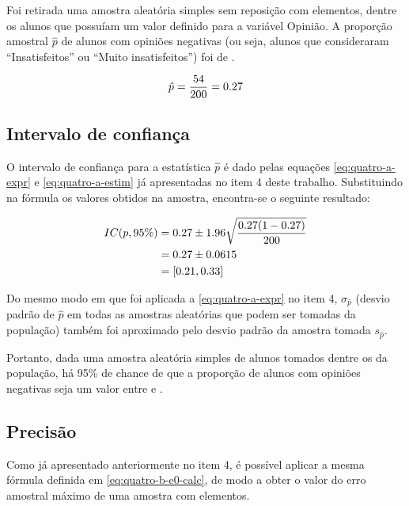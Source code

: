 

	Foi retirada uma amostra aleatória simples sem reposição com \CINCOn
	elementos, dentre os \CINCON alunos que possuíam um valor definido para
	a variável Opinião.  A proporção amostral $\hat{p}$ de alunos com
	opiniões negativas (ou seja, alunos que consideraram ``Insatisfeitos''
	ou ``Muito insatisfeitos'') foi de \CINCOpAmostral.

	\begin{align*} 
		\hat{p}  &= {\frac{54}{200}} = 0.27 \nonumber \\
	\end{align*}

\subsection{Intervalo de confiança}

	O intervalo de confiança para a estatística $\hat{p}$ é dado pelas
	equações \eqref{eq:quatro-a-expr} e \eqref{eq:quatro-a-estim} já
	apresentadas no item 4 deste trabalho.  Substituindo na fórmula os
	valores obtidos na amostra, encontra-se o seguinte resultado:

	\begin{align} 
		IC(p, 95\%) 
					&= 0.27 \pm 1.96 \sqrt{\frac{0.27 (1- 0.27)}{200}} \nonumber \\
					&= 0.27 \pm 0.0615 \nonumber \\
					\label{eq:cinco-a-result}
					&= [0.21, 0.33]
	\end{align}

	Do mesmo modo em que foi aplicada a \autoref{eq:quatro-a-expr} no item
	4, $\sigma_{\hat{p}}$ (desvio padrão de $\hat{p}$ em todas as amostras
	aleatórias que podem ser tomadas da população) também foi aproximado
	pelo desvio padrão da amostra tomada $s_{\hat{p}}$.

	Portanto, dada uma amostra aleatória simples de \CINCOn alunos tomados
	dentre os \CINCON da população, há 95\% de chance de que a proporção de
	alunos com opiniões negativas seja um valor entre \CINCOAICinf e
	\CINCOAICsup.

\subsection{Precisão}

	Como já apresentado anteriormente no item 4, é possível aplicar a mesma
	fórmula definida em \eqref{eq:quatro-b-e0-calc}, de modo a obter o valor
	do erro amostral máximo de uma amostra com \CINCOn elementos.

